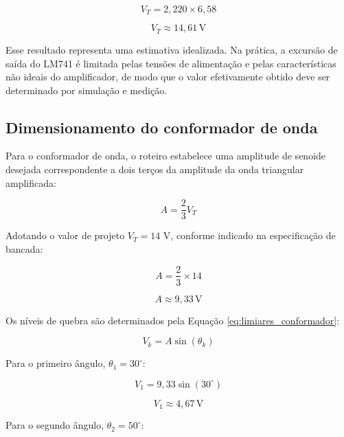 \documentclass[11pt,a4paper]{article}
\begin{document}
\begin{equation}
V_T=2,220\times6,58
\end{equation}

\begin{equation}
\boxed{V_T\approx14,61\,\text{V}}
\end{equation}

Esse resultado representa uma estimativa idealizada. Na prática, a excursão de saída do LM741 é limitada pelas tensões de alimentação e pelas características não ideais do amplificador, de modo que o valor efetivamente obtido deve ser determinado por simulação e medição.

\subsection{Dimensionamento do conformador de onda}

Para o conformador de onda, o roteiro estabelece uma amplitude de senoide desejada correspondente a dois terços da amplitude da onda triangular amplificada:

\begin{equation}
A=\frac{2}{3}V_T
\end{equation}

Adotando o valor de projeto $V_T=14$ V, conforme indicado na especificação de bancada:

\begin{equation}
A=\frac{2}{3}\times14
\end{equation}

\begin{equation}
\boxed{A\approx9,33\,\text{V}}
\end{equation}

Os níveis de quebra são determinados pela Equação \ref{eq:limiares_conformador}:

\begin{equation}
V_k=A\sin(\theta_k)
\end{equation}

Para o primeiro ângulo, $\theta_1=30^\circ$:

\begin{equation}
V_1=9,33\sin(30^\circ)
\end{equation}

\begin{equation}
\boxed{V_1\approx4,67\,\text{V}}
\end{equation}

Para o segundo ângulo, $\theta_2=50^\circ$:
\end{document}
